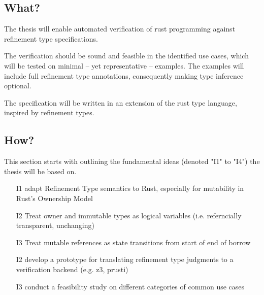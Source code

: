 \documentclass[11pt]{article}
\begin{document}


\subsection{What?}


The thesis will enable automated verification of rust programming against refinement type specifications.

The verification should be sound and feasible in the identified use cases, which will be tested on minimal -- yet representative -- examples. The examples will include full refinement type annotations, consequently making type inference optional.

The specification will be written in an extension of the rust type language, inspired by refinement types.

\subsection{How?} \label{ssec:How}

This section starts with outlining the fundamental ideas (denoted "I1" to "I4") the thesis will be based on.

\begin{itemize}
	\item[I1] adapt Refinement Type semantics to Rust, especially for mutability in Rust's Ownership Model
	\item[I2] Treat owner and immutable types as logical variables (i.e. referncially transparent, unchanging)
	\item[I3] Treat mutable references as state transitions from start of end of borrow
	\item[I2] develop a prototype for translating refinement type judgments to a verification backend (e.g. z3, prusti)
	\item[I3] conduct a feasibility study on different categories of common use cases
\end{itemize}
\end{document}

